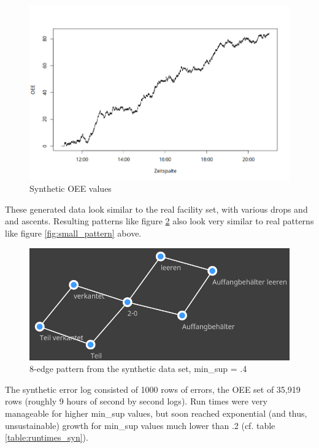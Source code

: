 \documentclass[pdftex,12pt,a4paper]{report}
\begin{document}
\begin{figure}
	\centering
	\includegraphics[width=1\linewidth]{images/dummy_random_walk}
	\caption{Synthetic OEE values}
	\label{fig:dummyrandomwalk}
\end{figure}

These generated data look similar to the real facility set, with various drops and and ascents. Resulting patterns like figure \ref{fig:dumm_pattern} also look very similar to real patterns like figure \ref{fig:small_pattern} above.

\begin{figure}
	\centering
	\includegraphics[width=1\linewidth]{images/dummy_pattern}
	\caption{8-edge pattern from the synthetic data set, min\_sup = .4}
	\label{fig:dumm_pattern}
\end{figure}

The synthetic error log consisted of 1000 rows of errors, the OEE set of 35,919 rows (roughly 9 hours of second by second logs). Run times were very manageable for higher min\_sup values, but soon reached exponential (and thus, unsustainable) growth for min\_sup values much lower than .2 (cf. table \ref{table:runtimes_syn}).
\end{document}
